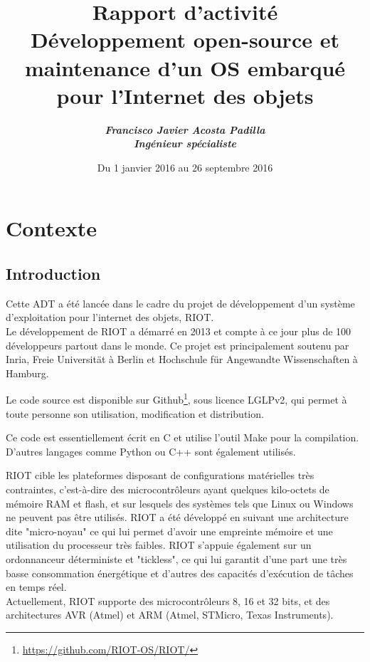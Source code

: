 \documentclass[a4paper, twoside]{article}
\title{\vskip 5cm {\huge
    Rapport d'activité 
      \\
      D\'eveloppement open-source et maintenance d'un OS embarqu\'e pour l'Internet des objets
  }
}
\author{\large \sl \bf
  Francisco Javier Acosta Padilla \\
  Ingénieur spécialiste
}
\date{
  Du 1 janvier 2016 au 26 septembre 2016
}
\begin{document}
\maketitle

\newpage

\section{Contexte}


\subsection{Introduction}


Cette ADT a été lancée dans le cadre du projet de développement d'un système
d'exploitation pour l'internet des objets, RIOT.\\

Le développement de RIOT a démarré en 2013 et compte à ce jour plus de 100 développeurs partout dans le monde.
Ce projet est principalement soutenu par Inria, Freie Universität à Berlin et Hochschule für Angewandte Wissenschaften à Hamburg.

Le code source est disponible sur
Github\footnote{\url{https://github.com/RIOT-OS/RIOT/}}, sous licence LGLPv2,
qui permet à toute personne son utilisation, modification et distribution.

Ce code est essentiellement écrit en C et utilise l'outil
Make pour la compilation. D'autres langages comme Python ou C++ sont également
utilisés.

RIOT cible les plateformes disposant de configurations matérielles très
contraintes, c'est-à-dire des microcontrôleurs ayant quelques kilo-octets de
mémoire RAM et flash, et sur lesquels des systèmes tels que Linux ou Windows 
ne peuvent pas être utilisés. RIOT a été développé en suivant une architecture
dite "micro-noyau" ce qui lui permet d'avoir une empreinte mémoire et une
utilisation du processeur très faibles. RIOT s'appuie également sur un
ordonnanceur déterministe et "tickless", ce qui lui garantit d'une part une très
basse consommation énergétique et d'autres des capacités d'exécution de tâches
en temps réel.\\

Actuellement, RIOT supporte des microcontrôleurs 8, 16 et 32 bits, et des
architectures AVR (Atmel) et ARM (Atmel, STMicro, Texas Instruments).
\end{document}
